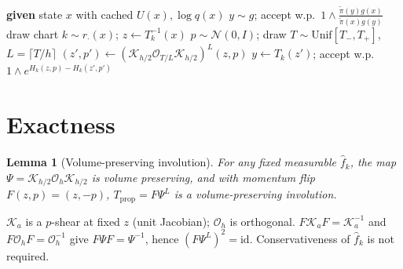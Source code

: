 \documentclass[10pt,journal,compsoc]{IEEEtran}
\newtheorem{lemma}{Lemma}
\begin{document}
\begin{algorithm}[t]
\caption{Production transition (frozen atlas)}\label{alg:prod}
\begin{algorithmic}[1]
\State \textbf{given} state $x$ with cached $U(x),\log q(x)$
 
  \State $y\sim g$;\; accept w.p.\ $1\wedge
    \frac{\tilde\pi(y)g(x)}{\tilde\pi(x)g(y)}$ 
\Else {}
  \State draw chart $k\sim r_\cdot(x)$;\; $z\gets T_k^{-1}(x)$
  \State $p\sim\mathcal N(0,I)$;\; draw $T\!\sim\!\mathrm{Unif}[T_-,T_+]$,
    $L=\lceil T/h\rceil$
  \State $(z',p')\gets(\mathcal K_{h/2}\mathcal O_{T/L}\mathcal K_{h/2})^L(z,p)$
  \State $y\gets T_k(z')$;\; accept w.p.\
    $1\wedge e^{H_k(z,p)-H_k(z',p')}$ 
\EndIf
\end{algorithmic}
\end{algorithm}

\section{Exactness}\label{sec:exact}
\begin{lemma}[Volume-preserving involution]\label{lem:involution}
For any fixed measurable $\hat f_k$, the map
$\Psi=\mathcal K_{h/2}\mathcal O_{h}\mathcal K_{h/2}$ is volume preserving,
and with momentum flip $F(z,p)=(z,-p)$, $T_{\mathrm{prop}}=F\Psi^L$ is a
volume-preserving involution.
\end{lemma}
\begin{IEEEproof}
$\mathcal K_a$ is a $p$-shear at fixed $z$ (unit Jacobian);
$\mathcal O_h$ is orthogonal. $F\mathcal K_aF=\mathcal K_a^{-1}$ and
$F\mathcal O_hF=\mathcal O_h^{-1}$ give
$F\Psi F=\Psi^{-1}$, hence $(F\Psi^L)^2=\mathrm{id}$. Conservativeness of
$\hat f_k$ is not required.
\end{IEEEproof}
\end{document}

